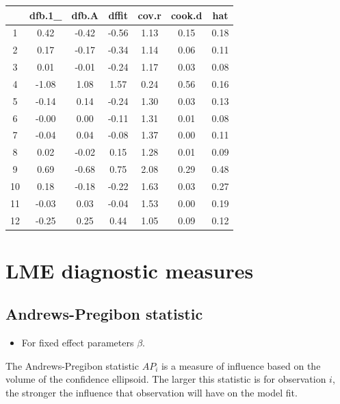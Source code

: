 \documentclass[12pt, a4paper]{report}
\theoremstyle{plain}
\theoremstyle{definition}
\theoremstyle{remark}
\begin{document}
	\begin{table}[ht]
		\begin{center}
			\begin{tabular}{|c|c|c|c|c|c|c|}
				\hline
				& dfb.1\_ & dfb.A & dffit & cov.r & cook.d & hat \\
				\hline
				1 & 0.42 & -0.42 & -0.56 & 1.13 & 0.15 & 0.18 \\
				2 & 0.17 & -0.17 & -0.34 & 1.14 & 0.06 & 0.11 \\
				3 & 0.01 & -0.01 & -0.24 & 1.17 & 0.03 & 0.08 \\
				4 & -1.08 & 1.08 & 1.57 & 0.24 & 0.56 & 0.16 \\
				5 & -0.14 & 0.14 & -0.24 & 1.30 & 0.03 & 0.13 \\
				6 & -0.00 & 0.00 & -0.11 & 1.31 & 0.01 & 0.08 \\
				7 & -0.04 & 0.04 & -0.08 & 1.37 & 0.00 & 0.11 \\
				8 & 0.02 & -0.02 & 0.15 & 1.28 & 0.01 & 0.09 \\
				9 & 0.69 & -0.68 & 0.75 & 2.08 & 0.29 & 0.48 \\
				10 & 0.18 & -0.18 & -0.22 & 1.63 & 0.03 & 0.27 \\
				11 & -0.03 & 0.03 & -0.04 & 1.53 & 0.00 & 0.19 \\
				12 & -0.25 & 0.25 & 0.44 & 1.05 & 0.09 & 0.12 \\
				\hline
			\end{tabular}
		\end{center}
	\end{table}
	
	
	
	
	
	
	
	\section{LME diagnostic measures}
	\subsection{Andrews-Pregibon statistic} %
	\begin{itemize}
		\item For fixed effect parameters $\beta$.
	\end{itemize}
	The Andrews-Pregibon statistic $AP_{i}$ is a measure of influence based on the volume of the confidence ellipsoid.
	The larger this statistic is for observation $i$, the stronger the influence that observation will have on the model fit.
	
\end{document}
